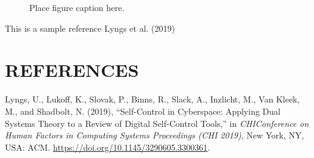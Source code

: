 \documentclass[11pt]{asaproc}
\newlength{\cslhangindent}
\newlength{\cslentryspacingunit} %
\newenvironment{CSLReferences}[2] %
 {%
  \setlength{\parindent}{0pt}
  \ifodd #1
  \let\oldpar\par
  \def\par{\hangindent=\cslhangindent\oldpar}
  \fi
  \setlength{\parskip}{#2\cslentryspacingunit}
 }%
 {}
\begin{document}
\begin{figure}[t]
\caption{Place figure caption here.}
\end{figure}

This is a sample reference Lyngs et al. (2019)

\hypertarget{references}{%
\section*{REFERENCES}\label{references}}

\hypertarget{refs}{}
\begin{CSLReferences}{1}{0}
\leavevmode{}%
Lyngs, U., Lukoff, K., Slovak, P., Binns, R., Slack, A., Inzlicht, M., Van Kleek, M., and Shadbolt, N. (2019), {``Self-{Control} in {Cyberspace}: Applying {Dual Systems Theory} to a {Review} of {Digital Self}-{Control Tools},''} in \emph{{CHIConference} on {Human Factors} in {Computing Systems Proceedings} ({CHI} 2019)}, {New York, NY, USA}: {ACM}. \url{https://doi.org/10.1145/3290605.3300361}.

\end{CSLReferences}
\end{document}
